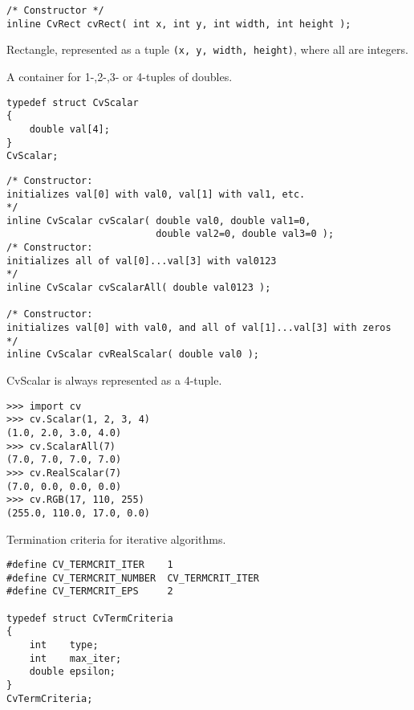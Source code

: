 \begin{description}
\end{description}

\begin{lstlisting}
/* Constructor */
inline CvRect cvRect( int x, int y, int width, int height );
\end{lstlisting}
\else %
Rectangle, represented as a tuple \texttt{(x, y, width, height)}, where all are integers.
\fi %

\label{CvScalar}
A container for 1-,2-,3- or 4-tuples of doubles.

\ifC %
\begin{lstlisting}
typedef struct CvScalar
{
    double val[4];
}
CvScalar;
\end{lstlisting}

\begin{lstlisting}
/* Constructor: 
initializes val[0] with val0, val[1] with val1, etc. 
*/
inline CvScalar cvScalar( double val0, double val1=0,
                          double val2=0, double val3=0 );
/* Constructor: 
initializes all of val[0]...val[3] with val0123 
*/
inline CvScalar cvScalarAll( double val0123 );

/* Constructor: 
initializes val[0] with val0, and all of val[1]...val[3] with zeros 
*/
inline CvScalar cvRealScalar( double val0 );
\end{lstlisting}
\else %

CvScalar is always represented as a 4-tuple.

\begin{lstlisting}
>>> import cv
>>> cv.Scalar(1, 2, 3, 4)
(1.0, 2.0, 3.0, 4.0)
>>> cv.ScalarAll(7)
(7.0, 7.0, 7.0, 7.0)
>>> cv.RealScalar(7)
(7.0, 0.0, 0.0, 0.0)
>>> cv.RGB(17, 110, 255)
(255.0, 110.0, 17.0, 0.0)
\end{lstlisting}
\fi %

\label{CvTermCriteria}
Termination criteria for iterative algorithms.

\ifC %
\begin{lstlisting}
#define CV_TERMCRIT_ITER    1
#define CV_TERMCRIT_NUMBER  CV_TERMCRIT_ITER
#define CV_TERMCRIT_EPS     2

typedef struct CvTermCriteria
{
    int    type;
    int    max_iter; 
    double epsilon; 
}
CvTermCriteria;
\end{lstlisting}

